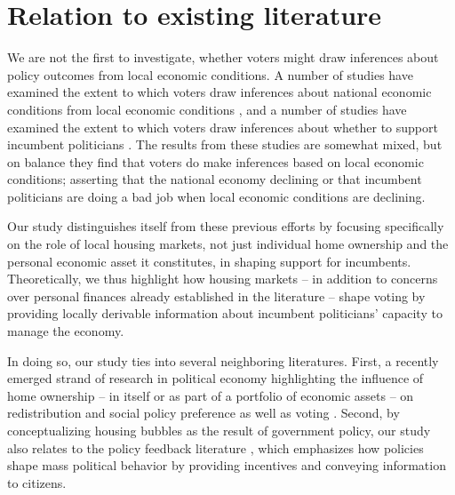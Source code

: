 \documentclass[12pt,a4paper]{article}
\begin{document}






\section{Relation to existing literature}

We are not the first to investigate, whether voters might draw inferences about policy outcomes from local economic conditions. A number of studies have examined the extent to which voters draw inferences about national economic conditions from local economic conditions \citep{books1999contextual,reeves2012ecologies,anderson2011local,ansolabehere2014mecro,bisgaard2016reconsidering}, and a number of studies have examined the extent to which voters draw inferences about whether to support incumbent politicians  \citep{hansford2015reevaluating,eisenberg2004economic,kim2003spatial,healy2014presidential}. The results from these studies are somewhat mixed, but on balance they find that voters do make inferences based on local economic conditions; asserting that the national economy declining or that incumbent politicians are doing a bad job when local economic conditions are declining. 

Our study distinguishes itself from these previous efforts by focusing specifically on the role of local housing markets, not just individual home ownership and the personal economic asset it constitutes, in shaping support for incumbents. Theoretically, we thus highlight how housing markets -- in addition to concerns over personal finances already established in the literature -- shape voting by providing locally derivable information about incumbent politicians’ capacity to manage the economy.

In doing so, our study ties into several neighboring literatures. First, a recently emerged strand of research in political economy highlighting the influence of home ownership -- in itself or as part of a portfolio of economic assets -- on redistribution and social policy preference as well as voting \citep{ansell2014political,nadeau2010patrimonial,stubager2013reaching}. Second, by conceptualizing housing bubbles as the result of government policy, our study also relates to the policy feedback literature \citep{pierson1993effect}, which emphasizes how policies shape mass political behavior by providing incentives and conveying information to citizens.
\end{document}
